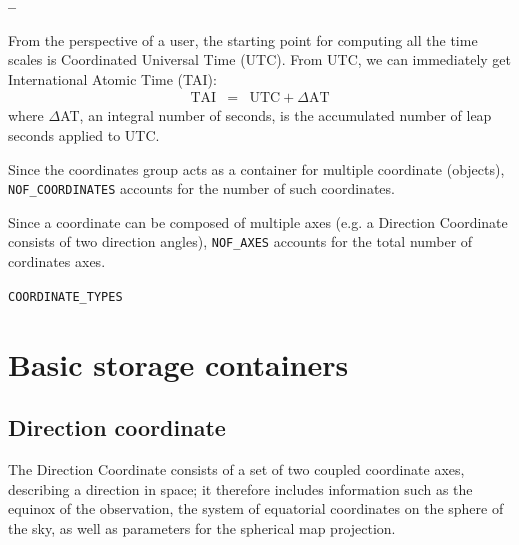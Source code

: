 \documentclass[a4paper,10pt,bibtotoc]{scrreprt}
\begin{document}
\begin{list}{\textbf{--}}{}

  From the perspective of a user, the starting point for computing all
  the time scales is Coordinated Universal Time (UTC). From UTC, we
  can immediately get International Atomic Time (TAI):
  \begin{eqnarray*}
    \mathrm{TAI} & = & \mathrm{UTC} + \Delta \mathrm{AT}
  \end{eqnarray*}
  where $\Delta$AT, an integral number of seconds, is the accumulated
  number of leap seconds applied to UTC.
\item Since the coordinates group acts as a container for multiple
  coordinate (objects), \verb|NOF_COORDINATES| accounts for the number
  of such coordinates.
\item Since a coordinate can be composed of multiple axes (e.g. a
  Direction Coordinate consists of two direction angles),
  \verb|NOF_AXES| accounts for the total number of cordinates axes.
\item \verb|COORDINATE_TYPES|
\end{list}


\section{Basic storage containers}
\label{sec:storage-containers}


\subsection{Direction coordinate}
\label{sec:coord-direction}

The Direction Coordinate consists of a set of two coupled coordinate
axes, describing a direction in space; it therefore includes
information such as the equinox of the observation, the system of
equatorial coordinates on the sphere of the sky, as well as parameters
for the spherical map projection.


\end{document}
